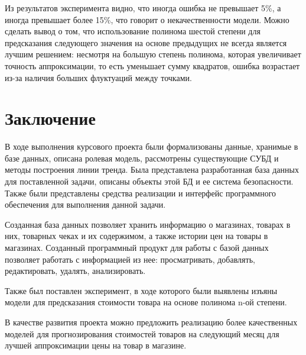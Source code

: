 \documentclass[a4paper,14pt]{extreport}
\begin{document}
Из результатов эксперимента видно, что иногда ошибка не превышает 5\%, а иногда превышает более 15\%, что говорит о некачественности модели. Можно сделать вывод о том, что использование полинома шестой степени для предсказания следующего значения на основе предыдущих не всегда является лучшим решением: несмотря на большую степень полинома, которая увеличивает точность аппроксимации, то есть уменьшает сумму квадратов, ошибка возрастает из-за наличия больших флуктуаций между точками.


\chapter*{Заключение}

В ходе выполнения курсового проекта были формализованы данные, хранимые в базе данных, описана ролевая модель, рассмотрены существующие СУБД и методы построения линии тренда. Была представлена разработанная база данных для поставленной задачи, описаны объекты этой БД и ее система безопасности. Также были представлены средства реализации и интерфейс программного обеспечения для выполнения данной задачи.

Созданная база данных позволяет хранить информацию о магазинах, товарах в них, товарных чеках и их содержимом, а также истории цен на товары в магазинах. Созданный программный продукт для работы с базой данных позволяет работать с информацией из нее: просматривать, добавлять, редактировать, удалять, анализировать.

Также был поставлен эксперимент, в ходе которого были выявлены изъяны модели для предсказания стоимости товара на основе полинома n-ой степени.

В качестве развития проекта можно предложить реализацию более качественных моделей для прогнозирования стоимостей товаров на следующий месяц для лучшей аппроксимации цены на товар в магазине. 

\newpage
{}
\renewcommand\bibname{Список литературы}
\end{document}
